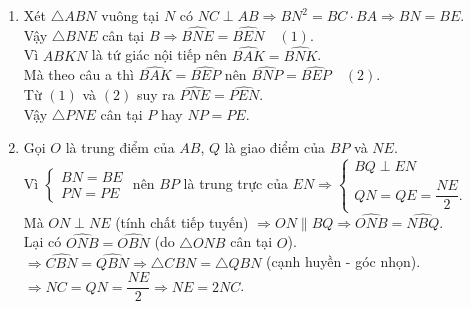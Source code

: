 \begin{ex}
{\begin{enumerate}
{
		}
		\item Xét $\triangle ABN$ vuông tại $N$ có $NC\perp AB\Rightarrow BN^2=BC\cdot BA\Rightarrow BN=BE$.\\
		Vậy $\triangle BNE$ cân tại $B\Rightarrow \widehat{BNE}=\widehat{BEN}\quad (1)$.\\
		Vì $ABKN$ là tứ giác nội tiếp nên $\widehat{BAK}=\widehat{BNK}$.\\
		Mà theo câu a thì $\widehat{BAK}=\widehat{BEP}$ nên $\widehat{BNP}=\widehat{BEP}\quad (2)$.\\
		Từ $(1)$ và $(2)$ suy ra $\widehat{PNE}=\widehat{PEN}$.\\
		Vậy $\triangle PNE$ cân tại $P$ hay $NP=PE$.
		\item Gọi $O$ là trung điểm của $AB$, $Q$ là giao điểm của $BP$ và $NE$.\\
		Vì $\begin{cases}
		BN=BE\\ PN=PE
		\end{cases}$ nên $BP$ là trung trực của $EN\Rightarrow\begin{cases}
			BQ\perp EN\\ QN=QE=\dfrac{NE}{2}.
		\end{cases}$\\
		Mà $ON\perp NE$ (tính chất tiếp tuyến) $\Rightarrow ON\parallel BQ\Rightarrow \widehat{ONB}=\widehat{NBQ}$.\\
		Lại có $\widehat{ONB}=\widehat{OBN}$ (do $\triangle ONB$ cân tại $O$).\\
		$\Rightarrow \widehat{CBN}=\widehat{QBN}\Rightarrow \triangle CBN=\triangle QBN$ (cạnh huyền - góc nhọn).\\
		$\Rightarrow NC=QN=\dfrac{NE}{2}\Rightarrow NE=2NC$.
	\end{enumerate}	
	}
\end{ex}
